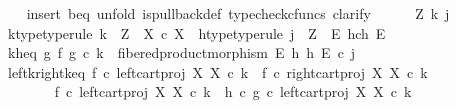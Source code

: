 \begin{isabellebody}
\ \ \isamarkupfalse%
\ {\isacharparenleft}{\kern0pt}insert\ b{\isacharunderscore}{\kern0pt}eq{\isacharcomma}{\kern0pt}\ unfold\ is{\isacharunderscore}{\kern0pt}pullback{\isacharunderscore}{\kern0pt}def{\isacharcomma}{\kern0pt}\ typecheck{\isacharunderscore}{\kern0pt}cfuncs{\isacharcomma}{\kern0pt}\ clarify{\isacharparenright}{\kern0pt}\isanewline
\ \ \ \ \isamarkupfalse%
\ Z\ k\ j\isanewline
\ \ \ \ \isamarkupfalse%
\ k{\isacharunderscore}{\kern0pt}type{\isacharbrackleft}{\kern0pt}type{\isacharunderscore}{\kern0pt}rule{\isacharbrackright}{\kern0pt}{\isacharcolon}{\kern0pt}\ {\isachardoublequoteopen}k\ {\isacharcolon}{\kern0pt}\ Z\ {\isasymrightarrow}\ X\ {\isasymtimes}\isactrlsub c\ X{\isachardoublequoteclose}\ \ h{\isacharunderscore}{\kern0pt}type{\isacharbrackleft}{\kern0pt}type{\isacharunderscore}{\kern0pt}rule{\isacharbrackright}{\kern0pt}{\isacharcolon}{\kern0pt}\ {\isachardoublequoteopen}j\ {\isacharcolon}{\kern0pt}\ Z\ {\isasymrightarrow}\ E\ \isactrlbsub h\isactrlesub {\isasymtimes}\isactrlsub c\isactrlbsub h\isactrlesub \ E{\isachardoublequoteclose}\isanewline
\ \ \ \ \isamarkupfalse%
\ k{\isacharunderscore}{\kern0pt}h{\isacharunderscore}{\kern0pt}eq{\isacharcolon}{\kern0pt}\ {\isachardoublequoteopen}{\isacharparenleft}{\kern0pt}g\ {\isasymtimes}\isactrlsub f\ g{\isacharparenright}{\kern0pt}\ {\isasymcirc}\isactrlsub c\ k\ {\isacharequal}{\kern0pt}\ fibered{\isacharunderscore}{\kern0pt}product{\isacharunderscore}{\kern0pt}morphism\ E\ h\ h\ E\ {\isasymcirc}\isactrlsub c\ j{\isachardoublequoteclose}\isanewline
\isanewline
\ \ \ \ \isamarkupfalse%
\ left{\isacharunderscore}{\kern0pt}k{\isacharunderscore}{\kern0pt}right{\isacharunderscore}{\kern0pt}k{\isacharunderscore}{\kern0pt}eq{\isacharcolon}{\kern0pt}\ {\isachardoublequoteopen}f\ {\isasymcirc}\isactrlsub c\ left{\isacharunderscore}{\kern0pt}cart{\isacharunderscore}{\kern0pt}proj\ X\ X\ {\isasymcirc}\isactrlsub c\ k\ {\isacharequal}{\kern0pt}\ f\ {\isasymcirc}\isactrlsub c\ right{\isacharunderscore}{\kern0pt}cart{\isacharunderscore}{\kern0pt}proj\ X\ X\ {\isasymcirc}\isactrlsub c\ k{\isachardoublequoteclose}\isanewline
\ \ \ \ \isamarkupfalse%
\ {\isacharminus}{\kern0pt}\isanewline
\ \ \ \ \ \ \isamarkupfalse%
\ {\isachardoublequoteopen}f\ {\isasymcirc}\isactrlsub c\ left{\isacharunderscore}{\kern0pt}cart{\isacharunderscore}{\kern0pt}proj\ X\ X\ {\isasymcirc}\isactrlsub c\ k\ {\isacharequal}{\kern0pt}\ h\ {\isasymcirc}\isactrlsub c\ g\ {\isasymcirc}\isactrlsub c\ left{\isacharunderscore}{\kern0pt}cart{\isacharunderscore}{\kern0pt}proj\ X\ X\ {\isasymcirc}\isactrlsub c\ k{\isachardoublequoteclose}\isanewline

\end{isabellebody}
